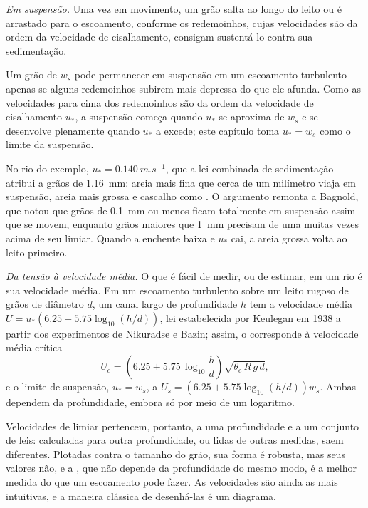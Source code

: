 \emph{Em suspensão.} Uma vez em movimento, um grão salta ao longo do leito ou é arrastado para o escoamento, conforme os redemoinhos, cujas velocidades são da ordem da velocidade de cisalhamento, consigam sustentá-lo contra sua sedimentação.

\begin{proposition}\label{prop:b1:erosion-transport:suspension}
Um grão de  $w_s$ pode permanecer em suspensão em um escoamento turbulento apenas se alguns redemoinhos subirem mais depressa do que ele afunda. Como as velocidades para cima dos redemoinhos são da ordem da velocidade de cisalhamento $u_*$, a suspensão começa quando $u_*$ se aproxima de $w_s$ e se desenvolve plenamente quando $u_*$ a excede; este capítulo toma $u_* = w_s$ como o limite da suspensão.
\end{proposition}
\admitted

No rio do exemplo, $u_* = \qty{0.140}{m.s^{-1}}$, que a lei combinada de sedimentação atribui a grãos de \qty{1.16}{mm}: areia mais fina que cerca de um milímetro viaja em suspensão, areia mais grossa e cascalho como . O argumento remonta a Bagnold, que notou que grãos de \qty{0.1}{mm} ou menos ficam totalmente em suspensão assim que se movem, enquanto grãos maiores que \qty{1}{mm} precisam de uma  muitas vezes acima de seu limiar. Quando a enchente baixa e $u_*$ cai, a areia grossa volta ao leito primeiro.

\emph{Da tensão à velocidade média.} O que é fácil de medir, ou de estimar, em um rio é sua velocidade média. Em um escoamento turbulento sobre um leito rugoso de grãos de diâmetro $d$, um canal largo de profundidade $h$ tem a velocidade média $U = u_*\left(6.25 + 5.75\log_{10}(h/d)\right)$, lei estabelecida por Keulegan em 1938 a partir dos experimentos de Nikuradse e Bazin; assim, o  corresponde à velocidade média crítica
\[
  U_c = \left(6.25 + 5.75\,\log_{10}\frac{h}{d}\right)\sqrt{\theta_c\,R\,g\,d},
\]
e o limite de suspensão, $u_* = w_s$, a $U_s = \left(6.25 +
5.75\log_{10}(h/d)\right) w_s$. Ambas dependem da profundidade, embora só por meio de um logaritmo.

Velocidades de limiar pertencem, portanto, a uma profundidade e a um conjunto de leis: calculadas para outra profundidade, ou lidas de outras medidas, saem diferentes. Plotadas contra o tamanho do grão, sua forma é robusta, mas seus valores não, e a , que não depende da profundidade do mesmo modo, é a melhor medida do que um escoamento pode fazer. As velocidades são ainda as mais intuitivas, e a maneira clássica de desenhá-las é um diagrama.

